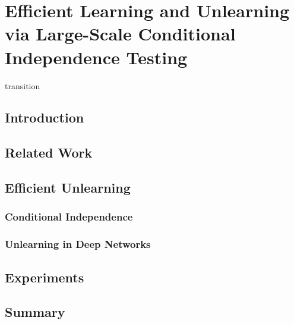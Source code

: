 \chapter{Efficient Learning and Unlearning via Large-Scale Conditional Independence Testing} \label{chap:lcodec} 

transition

\section{Introduction}

\section{Related Work}

\section{Efficient Unlearning}

\subsection{Conditional Independence}

\subsection{Unlearning in Deep Networks}

\section{Experiments}

\section{Summary}